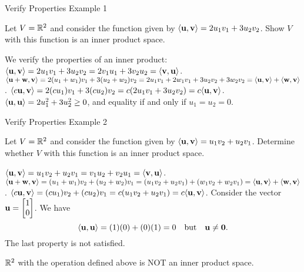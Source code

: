 \documentclass[xcolor=dvipsnames,aspectratio=169,t]{beamer}
\begin{document}
\begin{frame}{Verify Properties Example 1}
  \smallskip

  Let $V = \mathbb{R}^2$ and consider the function given by $\langle \mathbf{u} , \mathbf{v} \rangle = 2u_1v_1 + 3u_2v_2$. 
  Show $V$ with this function is an inner product space.
  \bigskip

  \pause
  We verify the properties of an \alert{inner product}:
  \medskip
  \bb
  \ii $\langle \mathbf{u} , \mathbf{v} \rangle = 2u_1v_1 + 3u_2v_2 =  2v_1u_1 + 3v_2u_2 = \langle \mathbf{v} , \mathbf{u} \rangle$.
  \medskip
  \ii $\langle \mathbf{u} + \mathbf{w} , \mathbf{v} \rangle = 2(u_1+w_1)v_1 + 3(u_2+w_2) v_2 =  2u_1v_1 + 2w_1v_1  + 3u_2v_2 + 3w_2v_2 = \langle \mathbf{u} , \mathbf{v} \rangle + \langle \mathbf{w} , \mathbf{v} \rangle$.%
  \medskip
  \ii  $\langle c\mathbf{u} , \mathbf{v} \rangle = 2(cu_1)v_1 + 3(cu_2) v_2 = c(2u_1v_1+3u_2v_2) = c \langle \mathbf{u} , \mathbf{v} \rangle$.
  \medskip
  \ii $\langle \mathbf{u} , \mathbf{u} \rangle = 2u_1^2 + 3u_2^2 \geq 0$, and equality if and only if $u_1=u_2 =0$.
  \ee
\end{frame}

\begin{frame}{Verify Properties Example 2}
  \smallskip
  
  Let $V = \mathbb{R}^2$ and consider the function given by $\langle \mathbf{u} , \mathbf{v} \rangle = u_1v_2 + u_2v_1$. Determine whether $V$ with this function is an inner product space.
  \smallskip

  \pause
  \bb
  \ii $\langle \mathbf{u} , \mathbf{v} \rangle = u_1v_2 + u_2v_1 = v_1u_2 + v_2u_1 =  \langle \mathbf{v} , \mathbf{u} \rangle$. 
  \medskip
  \ii $\langle \mathbf{u} + \mathbf{w} , \mathbf{v} \rangle = (u_1+w_1)v_2 + (u_2+w_2)v_1 = (u_1v_2 + u_2v_1)+(w_1v_2+w_2v_1) = \langle \mathbf{u} , \mathbf{v} \rangle + \langle \mathbf{w} , \mathbf{v} \rangle$.%
  \medskip
  \ii $\langle c \mathbf{u} , \mathbf{v} \rangle = (cu_1)v_2 + (cu_2)v_1 = c (u_1v_2 + u_2v_1) = c \langle \mathbf{u}, \mathbf{v} \rangle$.
  \medskip
  \pause
  \ii Consider the vector $\mathbf{u} = \begin{bmatrix} 1\\ 0 \end{bmatrix}$. We have
  \[ \langle \mathbf{u} , \mathbf{u} \rangle = (1)(0)+(0)(1) = 0 \quad \mbox{but} \quad \mathbf{u} \ne \mathbf{0}. \]
  The last property is \alert{not} satisfied.
  \ee
  \bigskip

  $\mathbb{R}^2$ with the operation defined above is \alert{NOT} an inner product space.
\end{frame}
\end{document}

